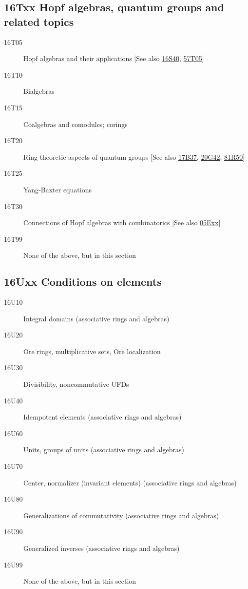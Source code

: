 \documentclass[letterpaper]{article}
\begin{document}
\subsection*{16Txx  Hopf algebras, quantum groups and related topics }\label{16Txx}
\begin{description}  
\item [16T05]\label{16T05} Hopf algebras and their applications [See also \hyperref[16S40]{16S40}, \hyperref[57T05]{57T05}]
\item [16T10]\label{16T10} Bialgebras
\item [16T15]\label{16T15} Coalgebras and comodules; corings
\item [16T20]\label{16T20} Ring-theoretic aspects of quantum groups [See also \hyperref[17B37]{17B37}, \hyperref[20G42]{20G42}, \hyperref[81R50]{81R50}]
\item [16T25]\label{16T25} Yang-Baxter equations
\item [16T30]\label{16T30} Connections of Hopf algebras with combinatorics [See also \hyperref[05Exx]{05Exx}]
\item [16T99]\label{16T99} None of the above, but in this section
\end{description}
\subsection*{16Uxx  Conditions on elements }\label{16Uxx}
\begin{description}  
\item [16U10]\label{16U10} Integral domains (associative rings and algebras)
\item [16U20]\label{16U20} Ore rings, multiplicative sets, Ore localization
\item [16U30]\label{16U30} Divisibility, noncommutative UFDs
\item [16U40]\label{16U40} Idempotent elements (associative rings and algebras)
\item [16U60]\label{16U60} Units, groups of units (associative rings and algebras)
\item [16U70]\label{16U70} Center, normalizer (invariant elements) (associative rings and algebras)
\item [16U80]\label{16U80} Generalizations of commutativity (associative rings and algebras)
\item [16U90]\label{16U90} Generalized inverses (associative rings and algebras)
\item [16U99]\label{16U99} None of the above, but in this section
\end{description}
\end{document}
